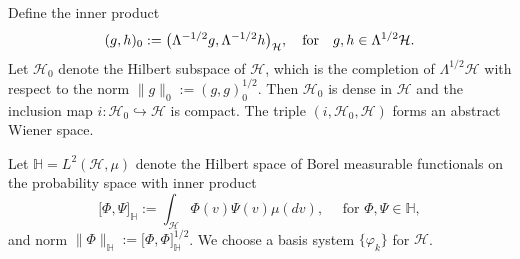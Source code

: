 \documentclass[review, onefignum, onetabnum]{siamart171218}
\begin{document}
    Define the inner product
\[
    ( g, h )_0 := 
    \big( 
        \Lambda^{-1/2}g ,
        \Lambda^{-1/2} h
    \big)_\mathcal{H},
    \quad 
    \hbox{\rm for}
    \quad g, h \in 
    \Lambda^{1/2} 
    \mathcal{H}.
\]
Let $\mathcal{H}_0$ denote the Hilbert subspace of $\mathcal{H}$, which is the
completion of $\Lambda^{1/2} \mathcal{H}$ with
respect to the norm $\|g\|_0:= ( g, g )_0^{1/2} $. Then ${\mathcal{H}_0}$ is
dense in $\mathcal{H}$ and the inclusion map
$i:\mathcal{H}_0\hookrightarrow\mathcal{H}$ is compact. The triple
$(i,\mathcal{H}_0,\mathcal{H})$ forms an abstract Wiener space.

    Let
$
    \mathbb{H} = L^2 (\mathcal{H}, \mu)
$
denote the Hilbert space of Borel
measurable functionals on the probability space with inner
product
\[
    \big[ 
        \Phi,
        \Psi
    \big]_\mathbb{H}
    :=
        \int_{\mathcal{H}} 
        \Phi(v)
        \Psi(v)\mu(dv),\quad
        \text{ for } 
        \Phi,\Psi\in\mathbb{H},
\]
and norm $\|\Phi\|_{\mathbb{H}}:=\big [\Phi,\Phi\big ]_\mathbb{H}^{1/2}$.
We choose a basis system $\{\varphi_k\}$ for $\mathcal{H}$.
\end{document}
